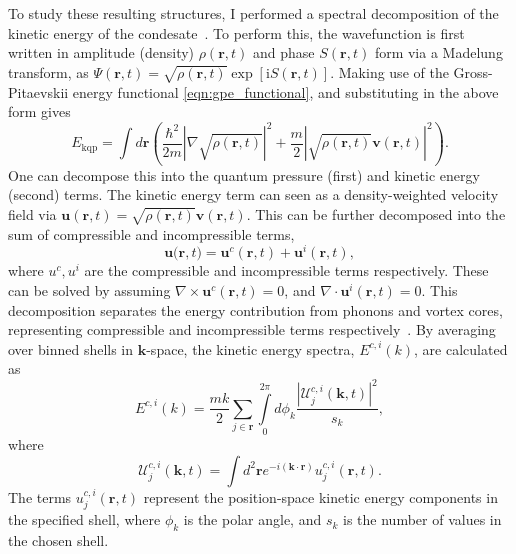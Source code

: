 To study these resulting structures, I performed a spectral decomposition of the kinetic energy of the condesate~\cite{CT:Nore_prl_1997,CT:Nore_pof_1997,CT:Bradley_prx_2012}. To perform this, the wavefunction is first written in amplitude (density) $\rho(\mathbf{r},t)$ and phase $S(\mathbf{r},t)$ form via a Madelung transform, as
$
		\Psi(\mathbf{r},t) = \sqrt{\rho(\mathbf{r},t)}\exp{\left[\mathrm{i}S(\mathbf{r},t)\right]}.
$
Making use of the Gross-Pitaevskii energy functional \ref{eqn:gpe_functional}, and substituting in the above form gives
\begin{equation}
    E_{\text{kqp}} = \int d\mathbf{r} \left( \frac{\hbar^2}{2m}| \nabla\sqrt{\rho(\mathbf{r},t)} |^2  + \frac{m}{2}|\sqrt{\rho(\mathbf{r},t)}\mathbf{v}(\mathbf{r},t) |^2\right).
\end{equation}
One can decompose this into the quantum pressure (first) and kinetic energy (second) terms. The kinetic energy term can seen as a density-weighted velocity field via $\mathbf{u}(\mathbf{r},t) = \sqrt{\rho(\mathbf{r},t)}\mathbf{v}(\mathbf{r},t)$. This can be further decomposed into the sum of compressible and incompressible terms,
\begin{equation}
    \mathbf{u(r},t) = \mathbf{u}^c(\mathbf{r},t) + \mathbf{u}^i(\mathbf{r},t),
\end{equation}
where $u^c, u^i$ are the compressible and incompressible terms respectively. These can be solved by assuming  $\nabla \times \mathbf{u}^c(\mathbf{r},t) = 0$, and $\nabla \cdot \mathbf{u}^i(\mathbf{r},t) = 0$. This decomposition separates the energy contribution from phonons and vortex cores, representing compressible and incompressible terms respectively~\cite{CT:Horng_pra_2009}. By averaging over binned shells in $\mathbf{k}$-space, the kinetic energy spectra, $E^{c,i}(k)$, are calculated as~\cite{CT:Bradley_prx_2012}
\begin{equation}
	E^{c,i}(k) = \frac{mk}{2}\sum\limits_{j\in\mathbf{r}} \int\limits_{0}^{2\pi}d\phi_k \frac{ |\mathcal{U}_j^{c,i}(\mathbf{k},t) |^2}{s_k},
\end{equation}
where
\begin{equation}
	\mathcal{U}_j^{c,i}(\mathbf{k},t) = \int d^2 \mathbf{r} e^{-i(\mathbf{k}\cdot\mathbf{r})} u_j^{c,i}(\mathbf{r},t).
\end{equation}
The terms $u_j^{c,i}(\mathbf{r},t)$ represent the position-space kinetic energy components in the specified shell, where $\phi_k$ is the polar angle, and $s_k$ is the number of values in the chosen shell.

